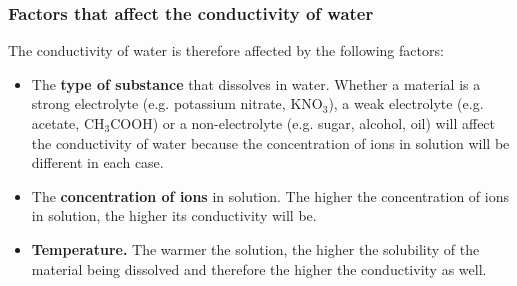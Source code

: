             \subsubsection{ Factors that affect the conductivity of water}
            \nopagebreak
            \label{m38720*id339287}The conductivity of water is therefore affected by the following factors:\par 
        \label{m38720*id339291}\begin{itemize}[noitemsep]
            \label{m38720*uid57}\item The \textbf{type of substance} that dissolves in water.
Whether a material is a strong electrolyte (e.g. potassium nitrate, ${\mathrm{KNO}}_{3}$), a weak electrolyte (e.g. acetate, ${\mathrm{CH}}_{3}\mathrm{COOH}$) or a non-electrolyte (e.g. sugar, alcohol, oil) will affect the conductivity of water because the concentration of ions in solution will be different in each case.
\label{m38720*uid58}\item The \textbf{concentration of ions} in solution.
The higher the concentration of ions in solution, the higher its conductivity will be.
\label{m38720*uid59}\item \textbf{Temperature.}
The warmer the solution, the higher the solubility of the material being dissolved and therefore the higher the conductivity as well.
\end{itemize}
\label{m38720*secfhsst!!!underscore!!!id739}

